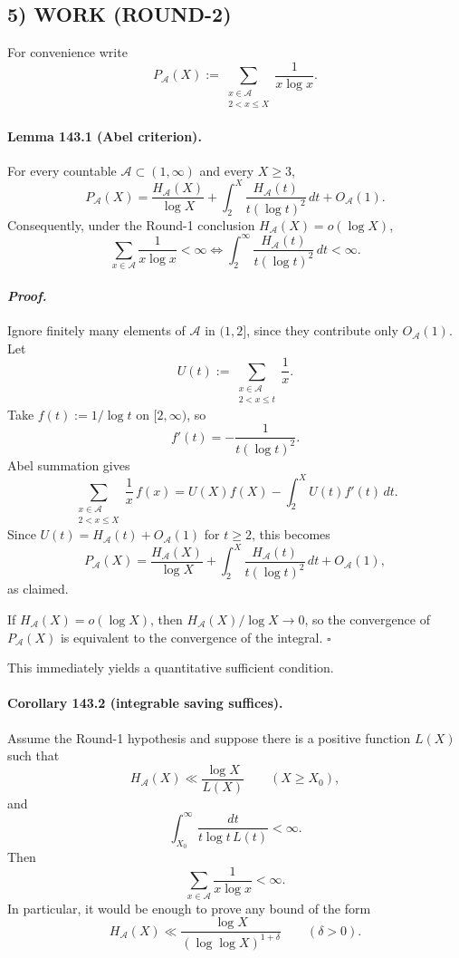 \subsection*{5) WORK (ROUND-2)}

For convenience write
\[
P_{\mathcal A}(X):=\sum_{\substack{x\in\mathcal A\\ 2<x\le X}}\frac{1}{x\log x}.
\]

\paragraph{\textbf{Lemma 143.1 (Abel criterion).}}
For every countable $\mathcal A\subset (1,\infty)$ and every $X\ge 3$,
\[
P_{\mathcal A}(X)
=
\frac{H_{\mathcal A}(X)}{\log X}
+
\int_2^X \frac{H_{\mathcal A}(t)}{t(\log t)^2}\,dt
+
O_{\mathcal A}(1).
\]
Consequently, under the Round-1 conclusion $H_{\mathcal A}(X)=o(\log X)$,
\[
\sum_{x\in\mathcal A}\frac{1}{x\log x}<\infty
\iff
\int_2^\infty \frac{H_{\mathcal A}(t)}{t(\log t)^2}\,dt<\infty.
\]

\paragraph{\textit{Proof.}}
Ignore finitely many elements of $\mathcal A$ in $(1,2]$, since they contribute only $O_{\mathcal A}(1)$.
Let
\[
U(t):=\sum_{\substack{x\in\mathcal A\\ 2<x\le t}}\frac1x.
\]
Take $f(t):=1/\log t$ on $[2,\infty)$, so
\[
f'(t)=-\frac{1}{t(\log t)^2}.
\]
Abel summation gives
\[
\sum_{\substack{x\in\mathcal A\\ 2<x\le X}}\frac1x\,f(x)
=
U(X)f(X)-\int_2^X U(t)f'(t)\,dt.
\]
Since $U(t)=H_{\mathcal A}(t)+O_{\mathcal A}(1)$ for $t\ge 2$, this becomes
\[
P_{\mathcal A}(X)
=
\frac{H_{\mathcal A}(X)}{\log X}
+
\int_2^X \frac{H_{\mathcal A}(t)}{t(\log t)^2}\,dt
+
O_{\mathcal A}(1),
\]
as claimed.

If $H_{\mathcal A}(X)=o(\log X)$, then $H_{\mathcal A}(X)/\log X\to 0$, so the convergence of
$P_{\mathcal A}(X)$ is equivalent to the convergence of the integral. \hfill $\square$

\medskip

This immediately yields a quantitative sufficient condition.

\paragraph{\textbf{Corollary 143.2 (integrable saving suffices).}}
Assume the Round-1 hypothesis and suppose there is a positive function $L(X)$ such that
\[
H_{\mathcal A}(X)\ll \frac{\log X}{L(X)}
\qquad (X\ge X_0),
\]
and
\[
\int_{X_0}^\infty \frac{dt}{t\log t\,L(t)}<\infty.
\]
Then
\[
\sum_{x\in\mathcal A}\frac{1}{x\log x}<\infty.
\]
In particular, it would be enough to prove any bound of the form
\[
H_{\mathcal A}(X)\ll \frac{\log X}{(\log\log X)^{1+\delta}}
\qquad (\delta>0).
\]

